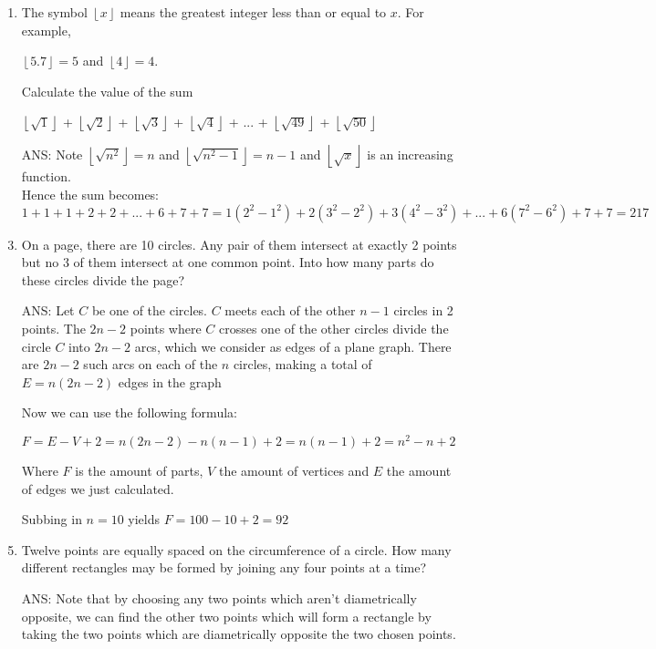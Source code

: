 \documentclass{article}
\begin{document}
\begin{enumerate}[1.]
\vspace{6pt}
\item %
The symbol $\left \lfloor{x}\right \rfloor$ means the greatest integer less than or equal to $x$. For example, 
\begin{center}
	$\left \lfloor{5.7}\right \rfloor = 5$ and $\left \lfloor{4}\right \rfloor = 4$.
\end{center} 
Calculate the value of the sum
\begin{center}
	$\left \lfloor{\sqrt{1}}\right \rfloor$ + $\left \lfloor{\sqrt{2}}\right \rfloor$ + $\left \lfloor{\sqrt{3}}\right \rfloor$ + $\left \lfloor{\sqrt{4}}\right \rfloor$ + ... + $\left \lfloor{\sqrt{49}}\right \rfloor$ + $\left \lfloor{\sqrt{50}}\right \rfloor$
\end{center}
\medskip
\item[ANS:]
Note $\left \lfloor{\sqrt{n^2}}\right\rfloor = n$ and $\left \lfloor{\sqrt{n^2-1}}\right\rfloor = n-1$ and  $\left \lfloor{\sqrt{x}}\right\rfloor$ is an increasing function.\\
Hence the sum becomes:\\
$1 + 1 + 1 + 2 + 2 + ... + 6 + 7 + 7 = 1(2^2-1^2) + 2(3^2-2^2) + 3(4^2-3^2) + ... + 6(7^2-6^2) + 7 + 7 = 217$


\vspace{6pt}
\item %
On a page, there are 10 circles. Any pair of them intersect at exactly 2 points but no 3 of
them intersect at one common point. Into how many parts do these circles divide the page?
\item[ANS:]
Let $C$ be one of the circles. $C$ meets each of the other $n-1$ circles in 2 points. The $2n-2$ points where $C$ crosses one of the other circles divide the circle $C$ into $2n-2$ arcs, which we consider as edges of a plane graph. There are $2n-2$ such arcs on each of the $n$ circles, making a total of $E=n(2n-2)$ edges in the graph

Now we can use the following formula:
\begin{center}
$F=E-V+2=n(2n-2)-n(n-1)+2=n(n-1)+2=n^2-n+2$
\end{center}
Where $F$ is the amount of parts, $V$ the amount of vertices and $E$ the amount of edges we just calculated.

Subbing in $n = 10$ yields $F = 100 - 10 + 2 = 92$


\vspace{6pt}
\item %
Twelve points are equally spaced on the circumference of a circle. How many different rectangles may be formed by joining any four points at a time?
\medskip
\item[ANS:]
Note that by choosing any two points which aren't diametrically opposite, we can find the other two points which will form a rectangle by taking the two points which are diametrically opposite the two chosen points.


\end{enumerate}
\end{document}
